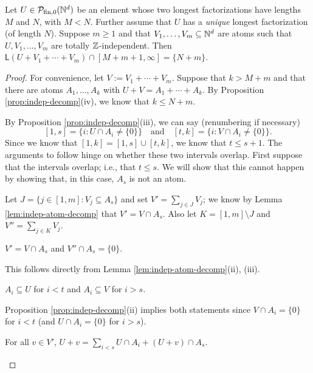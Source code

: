 \begin{lemma} \label{lem:unique longest factorization}
	Let $U\in \mathcal{P}_{\textrm{fin}, 0}(\mathbb{N}^d)$ be an element whose two longest factorizations have lengths $M$ and $N$, with $M < N$.
	Further assume that $U$ has a \textit{unique} longest factorization (of length $N$).
	Suppose $m\ge1$ and that $V_1,\dots,V_m\subseteq \mathbb{N}^d$ are atoms such that $U,V_1,\dots, V_m$ are totally $\mathbb{Z}$-independent.
	Then $\mathsf{L}(U+V_1+\cdots+V_m) \cap [ M+m+1,\infty ] = \{N+m\}$.
\end{lemma}

\setcounter{claim}{0}
\begin{proof}
	For convenience, let $V := V_1 + \cdots + V_m$.
	Suppose that $k > M + m$ and that there are atoms $A_1,\dots,A_k$ with $U+V = A_1 + \cdots + A_k$.
	By Proposition \ref{prop:indep-decomp}(iv), we know that $k \le N+m$.
	
	By Proposition \ref{prop:indep-decomp}(iii), we can say (renumbering if necessary)
	\[ [ 1,s ] =  \{ i: U\cap A_i \neq\{0\}\} \quad \textrm{and} \quad [ t,k ] = \{i: V\cap A_i \neq \{0\}\}. \]
	Since we know that $[ 1,k ] = [ 1,s ] \cup [ t,k ]$, we know that $t \le s+1$.
	The arguments to follow hinge on whether these two intervals overlap.  
	First suppose that the intervals overlap; i.e., that $t \le s$.
	We will show that this cannot happen by showing that, in this case, $A_s$ is not an atom.
	
	Let $J = \{ j\in[1,m]: V_j \subseteq A_s \}$ and set $V' = \sum_{j\in J} V_j$; we know by Lemma \ref{lem:indep-atom-decomp} that $V' = V \cap A_s$.
	Also let $K = [ 1,m ] \setminus J$ and $V'' = \sum_{j\in K} V_j$.
	
	\begin{claim} \label{cl:relevant part of V wrt to As}
	$V' = V\cap A_s$ and $V'' \cap A_s = \{0\}$. \label{cla}
	\end{claim}

	This follows directly from Lemma \ref{lem:indep-atom-decomp}(ii), (iii).
	
	\begin{claim} \label{cl:atoms inside factors}
	$A_i \subseteq U$ for $i<t$ and $A_i \subseteq V$ for $i > s$. \label{clb}
	\end{claim}
	
	Proposition \ref{prop:indep-decomp}(ii) implies both statements since $V \cap A_i = \{0\}$ for $i<t$ (and $U\cap A_i = \{0\}$ for $i>s$).
	
	\begin{claim} \label{cl:translates of U}
	For all $v\in V'$, $U+v = \sum\limits_{i<s} U\cap A_i + (U+v)\cap A_s$. \label{clc}
	\end{claim}


\end{proof}
